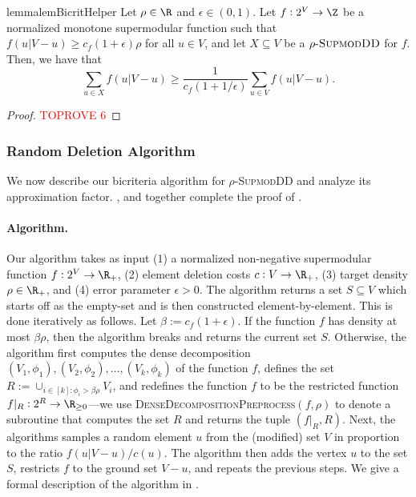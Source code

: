 \documentclass{article}
\newcommand{\supmoddensitydeletionset}{\textsc{SupmodDD}\xspace}
\newcommand{\sdds}{\ensuremath{\textsc{SupmodDD}}\xspace}
\newcommand{\rhosdds}[1]{\ensuremath{#1\text{-}\sdds}}
\begin{document}
\begin{restatable}{lemma}{lemBicritHelper}\label{lem:bicriteria-random-deletion-helper:main}
Let $\rho\in \R$ and $\epsilon \in (0, 1)$. Let $f:2^V\rightarrow\Z$ be a normalized monotone supermodular function such that $f(u|V - u) \geq c_f(1+\epsilon)\rho$ for all $u \in V$, and let $X \subseteq V$ be a \rhosdds{\rho} for $f$. Then, we have that
$$\sum_{u \in X} f(u|V-u) \geq \frac{1}{c_f (1 + 1/\epsilon)}\sum_{u \in V}f(u|V-u).$$
\end{restatable}
\begin{proof}\textcolor{red}{TOPROVE 6}\end{proof}

\subsubsection{Random Deletion Algorithm}\label{sec:bicriteria-random-deletion:algorithm}
We now describe our bicriteria algorithm for $\rho$-\supmoddensitydeletionset and analyze its approximation factor. ,  and 
together complete the proof of .

\paragraph{Algorithm.} Our algorithm takes as input (1) a normalized non-negative supermodular function $f:2^V\rightarrow\R_+$, (2) element deletion costs $c:V\rightarrow\R_+$, (3) target density $\rho \in \R_+$, and (4) error parameter $\epsilon > 0$. The algorithm returns a set $S \subseteq V$ which starts off as the empty-set and is then constructed element-by-element. This is done iteratively as follows. Let $\beta:=c_f (1+\epsilon)$. If the function $f$ has density at most $\beta\rho$, then the algorithm breaks and returns the current set $S$. Otherwise, the algorithm first computes the dense decomposition $(V_1, \phi_1), (V_2, \phi_2), \ldots, (V_k, \phi_k)$ of  the function $f$, defines the set $R := \cup_{i \in [k] : \phi_i > \beta\rho}V_i$, and redefines the function $f$ to be the restricted function $f|_R:2^R \rightarrow\R_{\geq 0}$---we use \textsc{DenseDecompositionPreprocess}$(f, \rho)$ to denote a subroutine that computes the set $R$ and returns the tuple $(f|_{R}, R)$. Next, the algorithms samples a random element $u$ from the (modified) set $V$ in proportion to the ratio $f(u|V-u)/c(u)$. The algorithm then adds the vertex $u$ to the set $S$, restricts $f$ to the ground set $V - u$, and repeats the previous steps. We give a formal description of the algorithm in .
\end{document}
